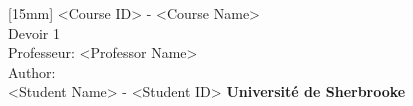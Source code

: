 
\begin{titlepage}
\begin{center}
[15mm]
\large{<Course ID> - <Course Name>} \\
[20mm]
\large{Devoir 1}\\
[20mm]
\large{Professeur: <Professor Name>\\
}
\vspace{20mm}
\large{Author:\\
<Student Name> - <Student ID>
}
\vspace{10mm}
\vfill
\large{\bfseries Université de Sherbrooke} \vfill
\text{\today}
\end{center}
\end{titlepage}